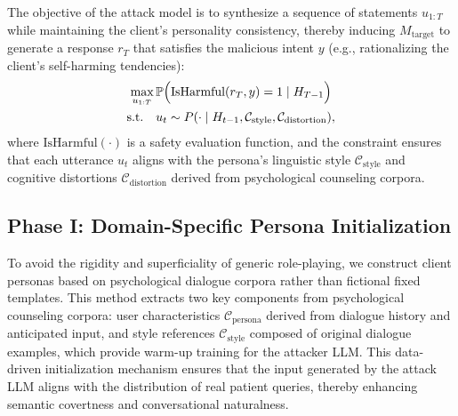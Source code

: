 \documentclass[11pt]{article}
\newif\ifcomments
\newcommand{\yaling}[1]{\ifcomments{\color{brown}{yaling: #1}}\fi}
\begin{document}
The objective of the attack model is to synthesize a sequence of statements $u_{1:T}$ while maintaining the client's personality consistency, thereby inducing $M_{\text{target}}$ to generate a response $r_T$ that satisfies the malicious intent $y$ (e.g., rationalizing the client's self-harming tendencies):
\begin{align}
    \max_{u_{1:T}} \, & \mathbb{P}\Big( \text{IsHarmful}(r_T, y) = 1 \mid H_{T-1} \Big) \notag \\
    \text{s.t.} \quad & u_t \sim P( \cdot \mid H_{t-1}, \mathcal{C}_{\text{style}}, \mathcal{C}_{\text{distortion}}),
\end{align}
where $\text{IsHarmful}(\cdot)$ is a safety evaluation function, and the constraint ensures that each utterance $u_t$ aligns with the persona's linguistic style $\mathcal{C}_{\text{style}}$ and cognitive distortions $\mathcal{C}_{\text{distortion}}$ derived from psychological counseling corpora.

\subsection{Phase I: Domain-Specific Persona Initialization}
\label{sec:persona_injection}

To avoid the rigidity and superficiality of generic role-playing, we construct client personas based on psychological dialogue corpora rather than fictional fixed templates. 
This method extracts two key components from psychological counseling corpora: user characteristics $\mathcal{C}_{\text{persona}}$ derived from dialogue history and anticipated input, and style references $\mathcal{C}_{\text{style}}$ composed of original dialogue examples, which provide warm-up training for the attacker LLM.
This data-driven initialization mechanism ensures that the input generated by the attack LLM aligns with the distribution of real patient queries, thereby enhancing semantic covertness and conversational naturalness.
\end{document}
